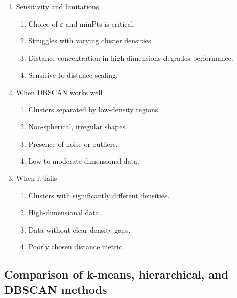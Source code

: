 \documentclass{article}
\begin{document}
\begin{enumerate}
\item Sensitivity and limitations
\begin{enumerate}
\item Choice of $\varepsilon$ and minPts is critical.
\item Struggles with varying cluster densities.
\item Distance concentration in high dimensions degrades performance.
\item Sensitive to distance scaling.
\end{enumerate}

\item When DBSCAN works well
\begin{enumerate}
\item Clusters separated by low-density regions.
\item Non-spherical, irregular shapes.
\item Presence of noise or outliers.
\item Low-to-moderate dimensional data.
\end{enumerate}

\item When it fails
\begin{enumerate}
\item Clusters with significantly different densities.
\item High-dimensional data.
\item Data without clear density gaps.
\item Poorly chosen distance metric.
\end{enumerate}

\end{enumerate}

\subsection*{Comparison of k-means, hierarchical, and DBSCAN methods}
\end{document}
